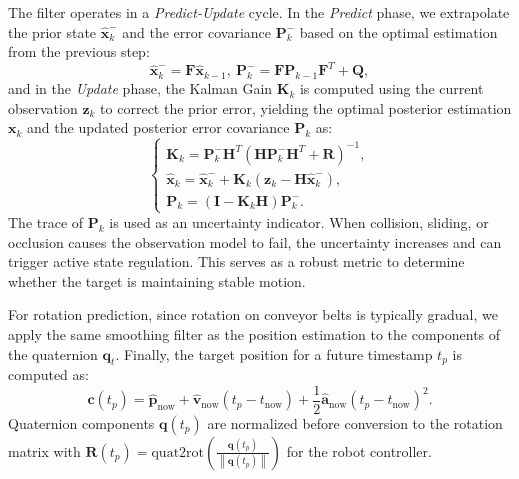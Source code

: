 The filter operates in a \textit{Predict-Update} cycle. In the \textit{Predict} phase, we extrapolate the prior state $\hat{\boldsymbol{x}}_{k}^{-}$ and the error covariance $\boldsymbol{P}_{k}^{-}$ based on the optimal estimation from the previous step:
\begin{equation}
\hat{\boldsymbol{x}}_{k}^{-}=\boldsymbol{F}\hat{\boldsymbol{x}}_{k-1},\
\boldsymbol{P}_{k}^{-}=\boldsymbol{F}\boldsymbol{P}_{k-1}\boldsymbol{F}^{T}+\boldsymbol{Q},
\end{equation}
and in the \textit{Update} phase, the Kalman Gain $\boldsymbol{K}_{k}$ is computed using the current observation $\boldsymbol{z}_k$ to correct the prior error, yielding the optimal posterior estimation $\boldsymbol{x}_k$ and the updated posterior error covariance $\boldsymbol{P}_{k}$ as:
\begin{equation}
\begin{cases}
    \boldsymbol{K}_{k}=\boldsymbol{P}_{k}^{-}\boldsymbol{H}^{T}(\boldsymbol{H}\boldsymbol{P}_{k}^{-}\boldsymbol{H}^{T}+\boldsymbol{R})^{-1}, \\
\hat{\boldsymbol{x}}_{k}=\hat{\boldsymbol{x}}_{k}^{-}+\boldsymbol{K}_{k}(\boldsymbol{z}_{k}-\boldsymbol{H}\hat{\boldsymbol{x}}_{k}^{-}), \\
\boldsymbol{P}_{k}=(\boldsymbol{I}-\boldsymbol{K}_{k}\boldsymbol{H})\boldsymbol{P}_{k}^{-}.
\end{cases}
\end{equation}
The trace of $\boldsymbol{P}_{k}$ is used as an uncertainty indicator. When collision, sliding, or occlusion causes the observation model to fail, the uncertainty increases and can trigger active state regulation. This serves as a robust metric to determine whether the target is maintaining stable motion. 

For rotation prediction, since rotation on conveyor belts is typically gradual, we apply the same smoothing filter as the position estimation to the components of the quaternion $\boldsymbol{q}_t$. Finally, the target position for a future timestamp $t_p$ is computed as:
\begin{equation}
\boldsymbol{c}(t_p)=\hat{\boldsymbol{p}}_{\text{now}}+\hat{\boldsymbol{v}}_{\text{now}}(t_p-t_{\text{now}})+\frac{1}{2}\hat{\boldsymbol{a}}_{\text{now}}(t_p-t_{\text{now}})^2.
\end{equation}
Quaternion components $\boldsymbol{q}(t_p)$ are normalized before conversion to the rotation matrix with $\boldsymbol{R}(t_p) = \mathrm{quat2rot}(\frac{\boldsymbol{q}(t_p)}{\left \| \boldsymbol{q}(t_p) \right \| })$ for the robot controller.

